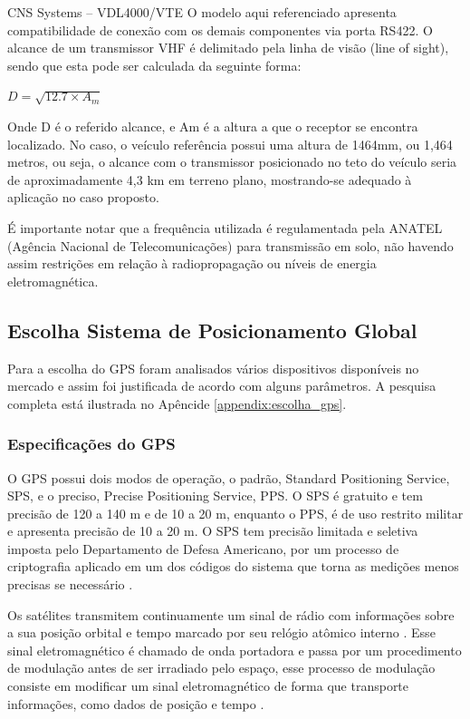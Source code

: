 CNS Systems – VDL4000/VTE \cite{datasheet_transponder}
O modelo aqui referenciado apresenta compatibilidade de conexão com os demais
componentes via porta RS422. O alcance de um transmissor VHF é delimitado pela
 linha de visão (line of sight), sendo que esta pode ser calculada da seguinte
 forma:

 $ D = \sqrt{12.7 \times A_{m}} $

 Onde D é o referido alcance, e Am é a altura a que o receptor se encontra
 localizado. No caso, o veículo referência possui uma altura de 1464mm, ou
 1,464 metros, ou seja, o alcance com o transmissor posicionado no teto do
 veículo seria de aproximadamente 4,3 km em terreno plano, mostrando-se
 adequado à aplicação no caso proposto.

 É importante notar que a frequência utilizada é regulamentada pela ANATEL
 (Agência Nacional de Telecomunicações) para transmissão em solo, não havendo
  assim restrições em relação à radiopropagação ou níveis de energia
  eletromagnética.

\subsection{Escolha Sistema de Posicionamento Global}

Para a escolha do GPS foram analisados vários dispositivos disponíveis no mercado
e assim foi justificada de acordo com alguns parâmetros. A pesquisa completa está
ilustrada no Apêncide \ref{appendix:escolha_gps}.

\subsubsection{Especificações do GPS}

O GPS possui dois modos de operação, o padrão, Standard Positioning Service,
SPS, e o preciso, Precise Positioning Service, PPS. O SPS é gratuito e tem
precisão de 120 a 140 m e de 10 a 20 m, enquanto o PPS, é de uso restrito
militar e apresenta precisão de 10 a 20 m. O SPS tem precisão limitada e
seletiva imposta pelo Departamento de Defesa Americano, por um processo de
criptografia aplicado em um dos códigos do sistema que torna as medições
menos precisas se necessário \cite{6gps}.

Os satélites transmitem continuamente um sinal de rádio com informações sobre
a sua posição orbital e tempo marcado por seu relógio atômico interno \cite{7gps}.
 Esse sinal eletromagnético é chamado de onda portadora e passa por um
 procedimento de modulação antes de ser irradiado pelo espaço, esse processo
 de modulação consiste em modificar um sinal eletromagnético de forma que
 transporte informações, como dados de posição e tempo \cite{8gps}.

